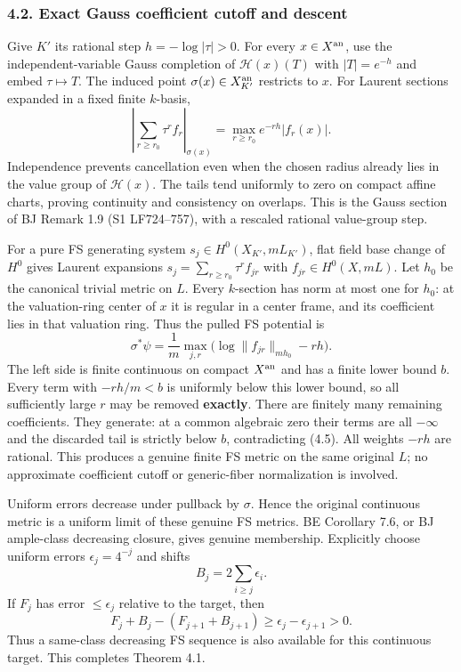 \documentclass[
  10pt,
]{article}
\begin{document}
\subsubsection{4.2. Exact Gauss coefficient cutoff and
descent}\label{exact-gauss-coefficient-cutoff-and-descent}

Give \(K'\) its rational step \(h=-\log|\tau|>0\). For every
\(x\in X^{\rm an}\), use the independent-variable Gauss completion of
\(\mathcal H(x)(T)\) with \(|T|=e^{-h}\) and embed \(\tau\mapsto T\).
The induced point \(\sigma(x)\in X_{K'}^{\rm an}\) restricts to \(x\).
For Laurent sections expanded in a fixed finite \(k\)-basis,
\[\left|\sum_{r\ge r_0}\tau^r f_r\right|_{\sigma(x)}
 =\max_{r\ge r_0}e^{-rh}|f_r(x)|.\tag{4.4}\] Independence prevents
cancellation even when the chosen radius already lies in the value group
of \(\mathcal H(x)\). The tails tend uniformly to zero on compact affine
charts, proving continuity and consistency on overlaps. This is the
Gauss section of BJ Remark 1.9 (S1 LF724--757), with a rescaled rational
value-group step.

For a pure FS generating system \(s_j\in H^0(X_{K'},mL_{K'})\), flat
field base change of \(H^0\) gives Laurent expansions
\(s_j=\sum_{r\ge r_0}\tau^r f_{jr}\) with \(f_{jr}\in H^0(X,mL)\). Let
\(h_0\) be the canonical trivial metric on \(L\). Every \(k\)-section
has norm at most one for \(h_0\): at the valuation-ring center of \(x\)
it is regular in a center frame, and its coefficient lies in that
valuation ring. Thus the pulled FS potential is
\[\sigma^*\psi=\frac1m\max_{j,r}
 \bigl(\log\|f_{jr}\|_{mh_0}-rh\bigr).\tag{4.5}\] The left side is
finite continuous on compact \(X^{\rm an}\) and has a finite lower bound
\(b\). Every term with \(-rh/m<b\) is uniformly below this lower bound,
so all sufficiently large \(r\) may be removed \textbf{exactly}. There
are finitely many remaining coefficients. They generate: at a common
algebraic zero their terms are all \(-\infty\) and the discarded tail is
strictly below \(b\), contradicting (4.5). All weights \(-rh\) are
rational. This produces a genuine finite FS metric on the same original
\(L\); no approximate coefficient cutoff or generic-fiber normalization
is involved.

Uniform errors decrease under pullback by \(\sigma\). Hence the original
continuous metric is a uniform limit of these genuine FS metrics. BE
Corollary 7.6, or BJ ample-class decreasing closure, gives genuine
membership. Explicitly choose uniform errors \(\epsilon_j=4^{-j}\) and
shifts \[B_j=2\sum_{i\ge j}\epsilon_i.\] If \(F_j\) has error
\(\le\epsilon_j\) relative to the target, then
\[F_j+B_j-(F_{j+1}+B_{j+1})\ge\epsilon_j-\epsilon_{j+1}>0.\] Thus a
same-class decreasing FS sequence is also available for this continuous
target. This completes Theorem 4.1.
\end{document}

